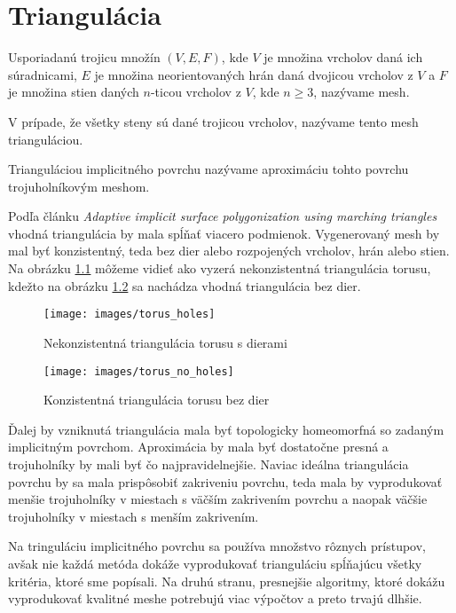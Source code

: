 \chapter{Triangulácia}

Usporiadanú trojicu množín $(V, E, F)$, kde $V$ je množina vrcholov daná ich súradnicami, 
$E$ je množina neorientovaných hrán daná 
dvojicou vrcholov z $V$ a $F$ je množina stien daných $n$-ticou vrcholov z $V$, kde $n \geq 3$, 
nazývame mesh.

V prípade, že všetky steny sú dané trojicou vrcholov, nazývame tento mesh trianguláciou.

Trianguláciou implicitného povrchu nazývame aproximáciu tohto povrchu trojuholníkovým meshom.

Podľa článku \textit{Adaptive implicit surface polygonization using marching triangles} \cite{akkouche2001adaptive}
vhodná triangulácia by mala spĺňať viacero podmienok. Vygenerovaný mesh by mal byť konzistentný, 
teda bez dier alebo rozpojených vrcholov, hrán alebo stien. Na obrázku \ref{obr:torus_holes}
môžeme vidieť ako vyzerá nekonzistentná triangulácia torusu, kdežto na obrázku \ref{obr:torus_no_holes}
sa nachádza vhodná triangulácia bez dier. 

\begin{figure}
    \centerline{\texttt{[image: images/torus\_holes]}}
    \caption[Nekonzistentná triangulácia torusu s dierami]{Nekonzistentná triangulácia torusu s dierami}
    \label{obr:torus_holes}
\end{figure}

\begin{figure}
    \centerline{\texttt{[image: images/torus\_no\_holes]}}
    \caption[Konzistentná triangulácia torusu bez dier]{Konzistentná triangulácia torusu bez dier}
    \label{obr:torus_no_holes}
\end{figure}

Ďalej by vzniknutá triangulácia mala byť topologicky homeomorfná 
so zadaným implicitným povrchom. Aproximácia by mala byť dostatočne presná a trojuholníky by mali 
byť čo najpravidelnejšie. Naviac ideálna triangulácia povrchu by sa mala prispôsobiť zakriveniu povrchu,
teda mala by vyprodukovať menšie trojuholníky v miestach s väčším zakrivením povrchu a naopak väčšie
trojuholníky v miestach s menším zakrivením.

Na tringuláciu implicitného povrchu sa používa množstvo rôznych prístupov, avšak nie každá metóda
dokáže vyprodukovať trianguláciu spĺňajúcu všetky kritéria, ktoré sme popísali. Na druhú stranu, 
presnejšie algoritmy, ktoré dokážu vyprodukovať kvalitné meshe potrebujú viac výpočtov a preto
trvajú dlhšie. 

